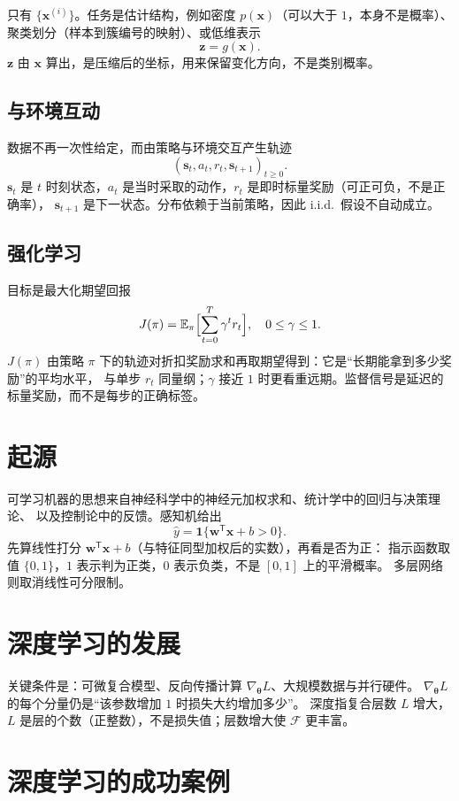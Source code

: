 只有 $\{\bm{x}^{(i)}\}$。任务是估计结构，例如密度 $p(\bm{x})$（可以大于 $1$，本身不是概率）、
聚类划分（样本到簇编号的映射）、或低维表示
\[
\bm{z}=g(\bm{x}).
\]
$\bm{z}$ 由 $\bm{x}$ 算出，是压缩后的坐标，用来保留变化方向，不是类别概率。

\subsection{与环境互动}

数据不再一次性给定，而由策略与环境交互产生轨迹
\[
(\bm{s}_t,a_t,r_t,\bm{s}_{t+1})_{t\ge 0}.
\]
$\bm{s}_t$ 是 $t$ 时刻状态，$a_t$ 是当时采取的动作，$r_t$ 是即时标量奖励（可正可负，不是正确率），
$\bm{s}_{t+1}$ 是下一状态。分布依赖于当前策略，因此 i.i.d.\ 假设不自动成立。

\subsection{强化学习}

目标是最大化期望回报
\[
J(\pi)=\mathbb{E}_{\pi}\Bigl[\sum_{t=0}^{T}\gamma^{t} r_t\Bigr],
\quad 0\le\gamma\le 1.
\]
$J(\pi)$ 由策略 $\pi$ 下的轨迹对折扣奖励求和再取期望得到：它是“长期能拿到多少奖励”的平均水平，
与单步 $r_t$ 同量纲；$\gamma$ 接近 $1$ 时更看重远期。监督信号是延迟的标量奖励，而不是每步的正确标签。

\section{起源}

可学习机器的思想来自神经科学中的神经元加权求和、统计学中的回归与决策理论、
以及控制论中的反馈。感知机给出
\[
\hat{y}=\mathbf{1}\{\bm{w}^{\mathsf T}\bm{x}+b>0\}.
\]
先算线性打分 $\bm{w}^{\mathsf T}\bm{x}+b$（与特征同型加权后的实数），再看是否为正：
指示函数取值 $\{0,1\}$，$1$ 表示判为正类，$0$ 表示负类，不是 $[0,1]$ 上的平滑概率。
多层网络则取消线性可分限制。

\section{深度学习的发展}

关键条件是：可微复合模型、反向传播计算 $\nabla_{\bm{\theta}}L$、大规模数据与并行硬件。
$\nabla_{\bm{\theta}}L$ 的每个分量仍是“该参数增加 $1$ 时损失大约增加多少”。
深度指复合层数 $L$ 增大，$L$ 是层的个数（正整数），不是损失值；层数增大使 $\mathcal{F}$ 更丰富。

\section{深度学习的成功案例}

